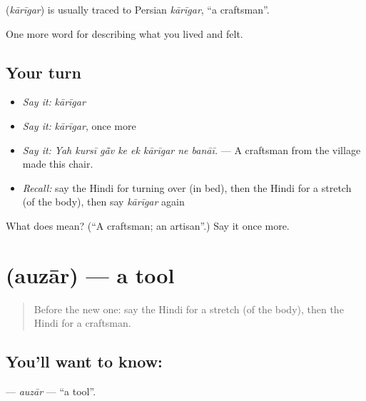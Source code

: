 \begin{cousinweb}
\textbf{} (\emph{kārīgar}) is usually traced to Persian \emph{kārīgar}, \textquotedblleft{}a craftsman\textquotedblright{}.
\end{cousinweb}

\begin{grammarlens}[title={What you've built}]
One more word for describing what you lived and felt.
\end{grammarlens}

\subsection*{Your turn}
\begin{itemize}
\raggedright
  \item \emph{Say it:} \emph{kārīgar}
  \item \emph{Say it:} \emph{kārīgar}, once more
  \item \emph{Say it:} \emph{Yah kursī gā̃v ke ek kārīgar ne banāī.} — A craftsman from the village made this chair.
  \item \emph{Recall:} say the Hindi for turning over (in bed), then the Hindi for a stretch (of the body), then say \emph{kārīgar} again
\end{itemize}

\begin{tcolorbox}[breakable,colback=teal!4,colframe=teal!35!black,title={Before you move on}]
What does  mean? (\textquotedblleft{}A craftsman; an artisan\textquotedblright{}.) Say it once more.
\end{tcolorbox}
\section[\texorpdfstring{\hi{औज़ार} (auzār)}{औज़ार (auzār)}]{ (auzār) — a tool}

\label{lesson:HI-C506-auzar}



\begin{quote}
Before the new one: say the Hindi for a stretch (of the body), then the Hindi for a craftsman.
\end{quote}

\subsection*{You'll want to know: }
\textbf{} — \emph{auzār} — \textquotedblleft{}a tool\textquotedblright{}.

